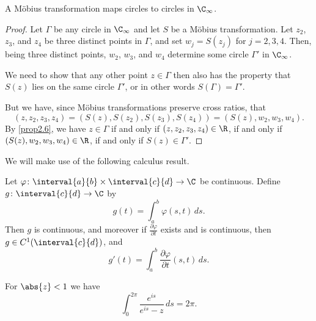 \begin{theorem}\label{thm2.7}
	A Möbius transformation maps circles to circles in $\C_\infty$.
\end{theorem}

\begin{proof}
	Let $\Gamma$ be any circle in $\C_\infty$ and let $S$ be a Möbius transformation.
	Let $z_2$, $z_3$, and $z_4$ be three distinct points in $\Gamma$, and set $w_j = S(z_j)$ for $j = 2, 3, 4$.
	Then, being three distinct points, $w_2$, $w_3$, and $w_4$ determine some circle $\Gamma'$ in $\C_\infty$.

	We need to show that any other point $z \in \Gamma$ then also has the property that $S(z)$ lies on the same circle $\Gamma'$, or in other words $S(\Gamma) = \Gamma'$.

	But we have, since Möbius transformations preserve cross ratios, that
	\[
		(z, z_2, z_3, z_4) = (S(z), S(z_2), S(z_3), S(z_4)) = (S(z), w_2, w_3, w_4).
	\]
	By \autoref{prop2.6}, we have $z \in \Gamma$ if and only if $(z, z_2, z_3, z_4) \in \R$, if and only if $(S(z), w_2, w_3, w_4) \in \R$, if and only if $S(z) \in \Gamma'$.
\end{proof}


We will make use of the following calculus result.

\begin{proposition}\label{prop3.1}
	Let $\varphi \colon \interval{a}{b} \times \interval{c}{d} \to \C$ be continuous.
	Define $g \colon \interval{c}{d} \to \C$ by
	\[
		g(t) = \int_a^b \varphi(s, t) \, d s.
	\]
	Then $g$ is continuous, and moreover if $\frac{\partial \varphi}{\partial t}$ exists and is continuous, then $g \in C^1(\interval{c}{d})$, and
	\[
		g'(t) = \int_a^b \frac{\partial \varphi}{\partial t} (s, t) \, d s.
	\]
\end{proposition}

\begin{lemma}\label{lem3.2}
	For $\abs{z} < 1$ we have
	\[
		\int_0^{2 \pi} \frac{e^{i s}}{e^{i s} - z} \, d s = 2 \pi.
	\]
\end{lemma}

